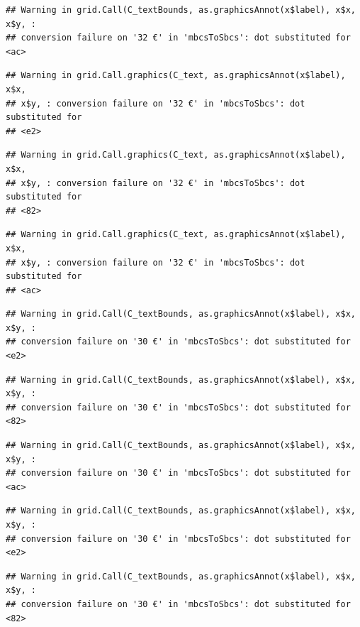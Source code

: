 \documentclass[]{gitbook}
\begin{document}
\begin{verbatim}
## Warning in grid.Call(C_textBounds, as.graphicsAnnot(x$label), x$x, x$y, :
## conversion failure on '32 €' in 'mbcsToSbcs': dot substituted for <ac>
\end{verbatim}

\begin{verbatim}
## Warning in grid.Call.graphics(C_text, as.graphicsAnnot(x$label), x$x,
## x$y, : conversion failure on '32 €' in 'mbcsToSbcs': dot substituted for
## <e2>
\end{verbatim}

\begin{verbatim}
## Warning in grid.Call.graphics(C_text, as.graphicsAnnot(x$label), x$x,
## x$y, : conversion failure on '32 €' in 'mbcsToSbcs': dot substituted for
## <82>
\end{verbatim}

\begin{verbatim}
## Warning in grid.Call.graphics(C_text, as.graphicsAnnot(x$label), x$x,
## x$y, : conversion failure on '32 €' in 'mbcsToSbcs': dot substituted for
## <ac>
\end{verbatim}

\begin{verbatim}
## Warning in grid.Call(C_textBounds, as.graphicsAnnot(x$label), x$x, x$y, :
## conversion failure on '30 €' in 'mbcsToSbcs': dot substituted for <e2>
\end{verbatim}

\begin{verbatim}
## Warning in grid.Call(C_textBounds, as.graphicsAnnot(x$label), x$x, x$y, :
## conversion failure on '30 €' in 'mbcsToSbcs': dot substituted for <82>
\end{verbatim}

\begin{verbatim}
## Warning in grid.Call(C_textBounds, as.graphicsAnnot(x$label), x$x, x$y, :
## conversion failure on '30 €' in 'mbcsToSbcs': dot substituted for <ac>
\end{verbatim}

\begin{verbatim}
## Warning in grid.Call(C_textBounds, as.graphicsAnnot(x$label), x$x, x$y, :
## conversion failure on '30 €' in 'mbcsToSbcs': dot substituted for <e2>
\end{verbatim}

\begin{verbatim}
## Warning in grid.Call(C_textBounds, as.graphicsAnnot(x$label), x$x, x$y, :
## conversion failure on '30 €' in 'mbcsToSbcs': dot substituted for <82>
\end{verbatim}
\end{document}
